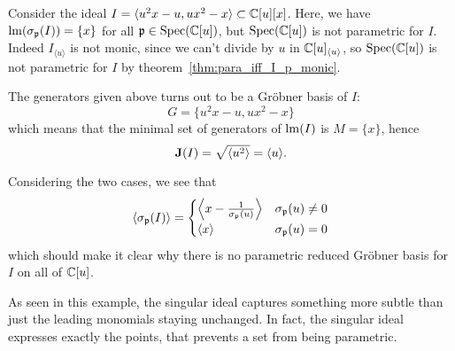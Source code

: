 \begin{example}\label{ex:u2x}\upshape
  Consider the ideal $I = \langle u^{2}x - u, ux^{2} - x \rangle \subset \mathbb{C}[u][x]$. Here, we have $\operatorname{lm}(\sigma_{\mathfrak p}(I)) = \{x\}$ for all $\mathfrak p \in \operatorname{Spec}(\mathbb{C}[u])$, but $\operatorname{Spec}(\mathbb{C}[u])$ is not parametric for $I$. Indeed $I_{\langle u \rangle}$ is not monic, since we can't divide by $u$ in $\mathbb{C}[u]_{\langle u \rangle}$, so $\operatorname{Spec}(\mathbb{C}[u])$ is not parametric for $I$ by theorem~\ref{thm:para_iff_I_p_monic}.

  The generators given above turns out to be a Gröbner basis of $I$:
  \[G = \{u^{2}x - u, ux^{2} - x\}\]
  which means that the minimal set of generators of $\operatorname{lm}(I)$ is $M = \{x\}$, hence
  \[\operatorname{\mathbf J}(I) = \sqrt{\langle u^{2} \rangle} = \langle u \rangle.\]

  Considering the two cases, we see that
  \[\langle \sigma_{\mathfrak p}(I) \rangle =
    \begin{cases}
      \left\langle x - \frac{1}{\sigma_{\mathfrak p}(u)} \right\rangle & \sigma_{\mathfrak p}(u) \neq 0 \\
      \langle x \rangle & \sigma_{\mathfrak p}(u) = 0
    \end{cases}
  \]
  which should make it clear why there is no parametric reduced Gröbner basis for $I$ on all of $\mathbb{C}[u]$.
\end{example}

As seen in this example, the singular ideal captures something more subtle than just the leading monomials staying unchanged. In fact, the singular ideal expresses exactly the points, that prevents a set from being parametric.

